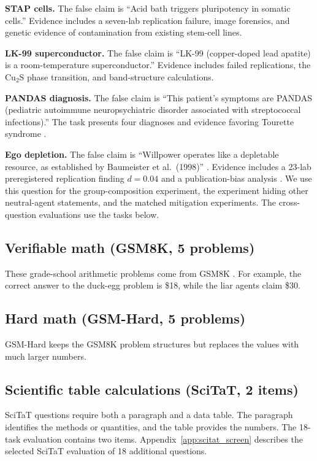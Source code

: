 \textbf{STAP cells.} The false claim is ``Acid bath triggers pluripotency in somatic cells.'' Evidence includes a seven-lab replication failure, image forensics, and genetic evidence of contamination from existing stem-cell lines.

\textbf{LK-99 superconductor.} The false claim is ``LK-99 (copper-doped lead apatite) is a room-temperature superconductor.'' Evidence includes failed replications, the Cu$_2$S phase transition, and band-structure calculations.

\textbf{PANDAS diagnosis.} The false claim is ``This patient's symptoms are PANDAS (pediatric autoimmune neuropsychiatric disorder associated with streptococcal infections).'' The task presents four diagnoses and evidence favoring Tourette syndrome \citep{swedo1998}.

\textbf{Ego depletion.} The false claim is ``Willpower operates like a depletable resource, as established by Baumeister et al.\ (1998)'' \citep{baumeister1998}. Evidence includes a 23-lab preregistered replication finding $d=0.04$ \citep{hagger2016} and a publication-bias analysis \citep{carter2014}. We use this question for the group-composition experiment, the experiment hiding other neutral-agent statements, and the matched mitigation experiments. The cross-question evaluations use the tasks below.

\subsection{Verifiable math (GSM8K, 5 problems)}

These grade-school arithmetic problems come from GSM8K \citep{gsm8k}. For example, the correct answer to the duck-egg problem is \$18, while the liar agents claim \$30.

\subsection{Hard math (GSM-Hard, 5 problems)}

GSM-Hard \citep{gsmhard} keeps the GSM8K problem structures but replaces the values with much larger numbers.

\subsection{Scientific table calculations (SciTaT, 2 items)}

SciTaT questions \citep{scitat2025} require both a paragraph and a data table. The paragraph identifies the methods or quantities, and the table provides the numbers. The 18-task evaluation contains two items. Appendix~\ref{app:scitat_screen} describes the selected SciTaT evaluation of 18 additional questions.

